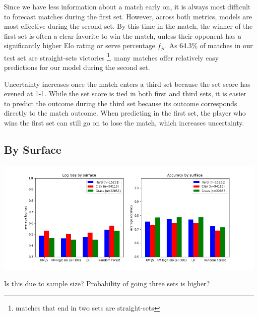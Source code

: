 \documentclass[chapterprefix=false]{report}
\begin{document}
Since we have less information about a match early on, it is always most difficult to forecast matches during the first set. However, across both metrics, models are most effective during the second set. By this time in the match, the winner of the first set is often a clear favorite to win the match, unless their opponent has a significantly higher Elo rating or serve percentage $f_{ji}$. As 64.3\% of matches in our test set are straight-sets victories \footnote{matches that end in two sets are straight-sets}, many matches offer relatively easy predictions for our model during the second set.

Uncertainty increases once the match enters a third set because the set score has evened at 1-1. While the set score is tied in both first and third sets, it is easier to predict the outcome during the third set because its outcome corresponds directly to the match outcome. When predicting in the first set, the player who wins the first set can still go on to lose the match, which increases uncertainty.



\subsection{By Surface}

\hspace*{-1.5cm}\includegraphics[scale=.6]{surface_performance2}


Is this due to sample size? Probability of going three sets is higher?
\end{document}
